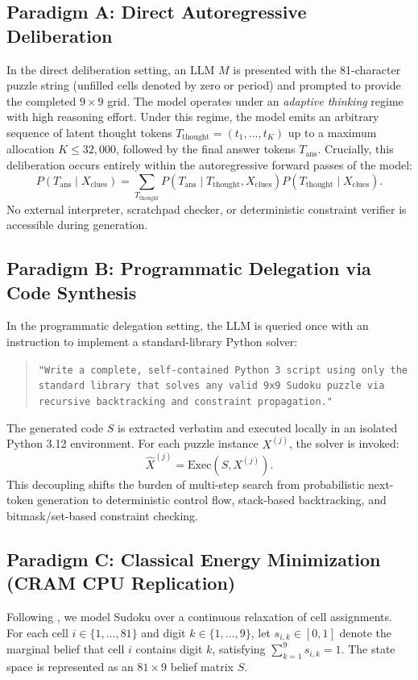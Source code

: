 \documentclass{article} %
\begin{document}
\subsection{Paradigm A: Direct Autoregressive Deliberation}
In the direct deliberation setting, an LLM $M$ is presented with the 81-character puzzle string (unfilled cells denoted by zero or period) and prompted to provide the completed $9 \times 9$ grid. The model operates under an \textit{adaptive thinking} regime with high reasoning effort. Under this regime, the model emits an arbitrary sequence of latent thought tokens $T_{\text{thought}} = (t_1, \dots, t_K)$ up to a maximum allocation $K \le 32{,}000$, followed by the final answer tokens $T_{\text{ans}}$. Crucially, this deliberation occurs entirely within the autoregressive forward passes of the model:
\begin{equation}
    P(T_{\text{ans}} \mid X_{\text{clues}}) = \sum_{T_{\text{thought}}} P(T_{\text{ans}} \mid T_{\text{thought}}, X_{\text{clues}}) P(T_{\text{thought}} \mid X_{\text{clues}}).
\end{equation}
No external interpreter, scratchpad checker, or deterministic constraint verifier is accessible during generation.

\subsection{Paradigm B: Programmatic Delegation via Code Synthesis}
In the programmatic delegation setting, the LLM is queried once with an instruction to implement a standard-library Python solver:
\begin{quote}
    \small\texttt{"Write a complete, self-contained Python 3 script using only the standard library that solves any valid 9x9 Sudoku puzzle via recursive backtracking and constraint propagation."}
\end{quote}
The generated code $S$ is extracted verbatim and executed locally in an isolated Python 3.12 environment. For each puzzle instance $X^{(j)}$, the solver is invoked:
\begin{equation}
    \hat{X}^{(j)} = \text{Exec}(S, X^{(j)}).
\end{equation}
This decoupling shifts the burden of multi-step search from probabilistic next-token generation to deterministic control flow, stack-based backtracking, and bitmask/set-based constraint checking.

\subsection{Paradigm C: Classical Energy Minimization (CRAM CPU Replication)}
Following \citet{hoover2026classical}, we model Sudoku over a continuous relaxation of cell assignments. For each cell $i \in \{1, \dots, 81\}$ and digit $k \in \{1, \dots, 9\}$, let $s_{i,k} \in [0, 1]$ denote the marginal belief that cell $i$ contains digit $k$, satisfying $\sum_{k=1}^9 s_{i,k} = 1$. The state space is represented as an $81 \times 9$ belief matrix $S$.
\end{document}
